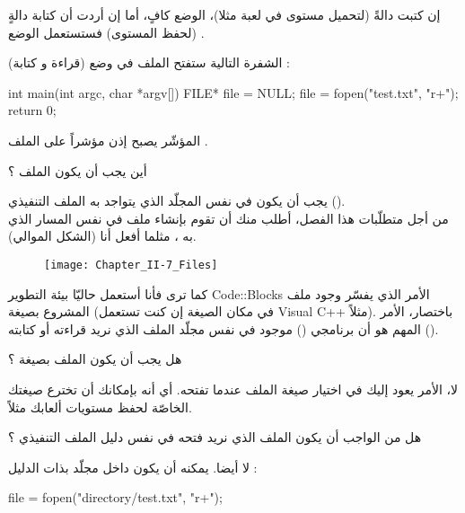 إن كتبت دالةً
(لتحميل مستوى في لعبة مثلا)، الوضع
كافٍ، أما إن أردت أن كتابة دالةٍ
(لحفظ المستوى) فستستعمل الوضع
.

الشفرة التالية ستفتح الملف
في وضع
(قراءة و كتابة) :

\begin{Csource}
int main(int argc, char *argv[])
{
	FILE* file = NULL;
	file = fopen("test.txt", "r+");
	return 0;
}
\end{Csource}

المؤشّر
يصبح إذن مؤشراً على الملف
.

\begin{question}
  أين يجب أن يكون الملف
؟
\end{question}

يجب أن يكون في نفس المجلّد الذي يتواجد به الملف التنفيذي
().\\
من أجل متطلّبات هذا الفصل، أطلب منك أن تقوم بإنشاء ملف
في نفس المسار الذي به
،
مثلما أفعل أنا (الشكل الموالي).

\begin{figure}[H]
	\centering
	\texttt{[image: Chapter\_II-7\_Files]}
\end{figure}

كما ترى فأنا أستعمل  حاليّا بيئة التطوير
\textenglish{Code::Blocks}
الأمر الذي يفسّر وجود ملف المشروع بصيغة
(في مكان الصيغة
إن كنت تستعمل
\textenglish{Visual C++}
مثلاً). باختصار، الأمر المهم هو أن برنامجي
()
موجود في نفس مجلّد الملف الذي نريد قراءته أو كتابته
().

\begin{question}
  هل يجب أن يكون الملف بصيغة
 ؟
\end{question}

لا، الأمر يعود إليك في اختيار صيغة الملف عندما تفتحه. أي أنه بإمكانك أن تخترع صيغتك الخاصّة
لحفظ مستويات ألعابك مثلاً.

\begin{question}
  هل من الواجب أن يكون الملف الذي نريد فتحه في نفس دليل الملف التنفيذي ؟
\end{question}

لا أيضا. يمكنه أن يكون داخل مجلّد بذات الدليل :

\begin{Csource}
file = fopen("directory/test.txt", "r+");
\end{Csource}

